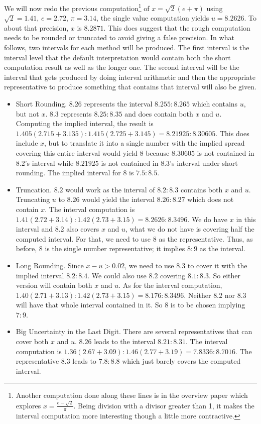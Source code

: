 \documentclass[12pt]{article}
\begin{document}
We will now redo the previous computation\footnote{Another computation done along these lines is in the overview paper \cite{taylor23over} which explores $x = \frac{e-\sqrt{2}}{\pi}$. Being division with a divisor greater than 1, it makes the interval computation more interesting though a little more contractive.} of $x = \sqrt{2}(e+\pi)$  using $\sqrt{2} = 1.41$,  $e=2.72$, $\pi = 3.14$, the single value computation yields $u = 8.2626$. To about that precision, $x$ is $8.2871$. This does suggest that the rough computation needs to be rounded or truncated to avoid giving a false precision. In what follows, two intervals for each method will be produced. The first interval is the interval level that the default interpretation would contain both the short computation result as well as the longer one. The second interval will be the interval that gets produced by doing interval arithmetic and then the appropriate representative to produce something that contains that interval will also be given. 

\begin{itemize}
    \item Short Rounding. $8.26$ represents the interval $8.255:8.265$ which contains $u$, but not $x$. $8.3$ represents $8.25:8.35$ and does contain both $x$ and $u$. Computing the implied interval, the result is $1.405(2.715 + 3.135):1.415(2.725 + 3.145)  = 8.21925:8.30605$. This does include $x$, but to translate it into a single number with the implied spread covering this entire interval would yield $8$ because $8.30605$ is not contained in $8.2$'s interval while $8.21925$ is not contained in $8.3$'s interval under short rounding. The implied interval for $8$ is $7.5:8.5$.
    \item Truncation. $8.2$ would work as the interval of $8.2:8.3$ contains both $x$ and $u$. Truncating $u$ to $8.26$ would yield the interval $8.26:8.27$ which does not contain $x$. The interval computation is $1.41(2.72+3.14):1.42(2.73+3.15)  = 8.2626:8.3496$. We do have $x$ in this interval and $8.2$ also covers $x$ and $u$, what we do not have is covering half the computed interval. For that, we need to use $8$ as the representative. Thus, as before, $8$ is the single number representative; it implies $8:9$ as the interval. 
    \item Long Rounding. Since $x-u > 0.02$, we need to use $8.3$ to cover it with the implied interval $8.2:8.4$. We could also use $8.2$ covering $8.1:8.3$. So either version will contain both $x$ and $u$. As for the interval computation, $1.40(2.71+3.13): 1.42(2.73+3.15) = 8.176: 8.3496$. Neither $8.2$ nor $8.3$ will have that whole interval contained in it. So $8$ is to be chosen implying $7:9$. 
    \item Big Uncertainty in the Last Digit. There are several representatives that can cover both $x$ and $u$. $8.26$ leads to the interval $8.21:8.31$. The interval computation is $1.36(2.67+3.09): 1.46(2.77+3.19) = 7.8336:8.7016$. The representative $8.3$ leads to $7.8:8.8$ which just barely covers the computed interval.  
\end{itemize}
\end{document}
